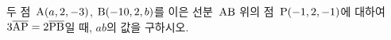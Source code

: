 두 점~$\mathrm{A}(a{,}\mkern3mu\mathopen{}2{,}\mkern3mu\mathopen{}-3)$, $\mathrm{B}(-10{,}\mkern3mu\mathopen{}2{,}\mkern3mu\mathopen{}b)$를 이은 선분~$\mathrm{AB}$ 위의 점~$\mathrm{P}(-1{,}\mkern3mu\mathopen{}2{,}\mkern3mu\mathopen{}-1)$에 대하여 $3\overline{\mathrm{AP}}=2\overline{\mathrm{PB}}$일 때, $ab$의 값을 구하시오.

